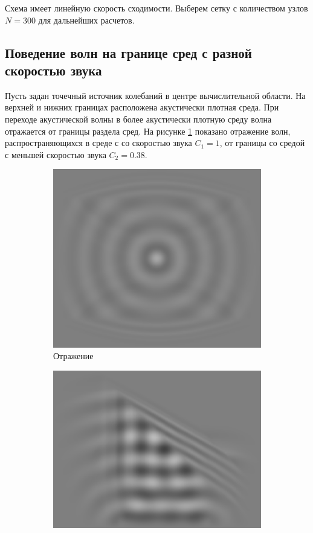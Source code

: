 \documentclass[a4paper, fontsize=14pt]{article}
\begin{document}
Схема имеет линейную скорость сходимости. Выберем сетку с количеством узлов $N=300$ для дальнейших
расчетов.
\subsection{Поведение волн на границе сред с разной скоростью звука}

Пусть задан точечный источник колебаний в центре вычислительной области. На верхней и нижних
границах расположена акустически плотная среда.
При переходе акустической волны в более акустически плотную среду волна отражается от
границы раздела сред. На рисунке \ref{wrefl} показано отражение волн, распространяющихся в среде с
со скоростью звука $C_1 = 1$, от границы со средой с меньшей скоростью звука $C_2 = 0.38$.
\begin{figure}[h]
	\centering
	\begin{subfigure}{0.3\textwidth}
		\centering
		\includegraphics[width=\textwidth]{refl.eps}
		\caption{Отражение}
		\label{wrefl}
	\end{subfigure}
	\begin{subfigure}{0.3\textwidth}
		\centering
		\includegraphics[width=\textwidth]{refr.eps}

\end{subfigure}
\end{figure}
\end{document}
